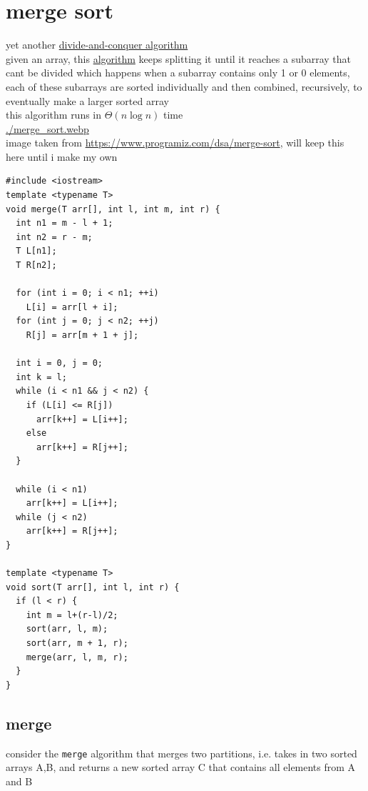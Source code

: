 \documentclass[a4paper,12pt]{article}
\begin{document}
\section{merge sort}
\label{sec:orgbb8d59e}
yet another \href{20220706211939-divide_and_conquer_algorithm.org}{divide-and-conquer algorithm}\\
given an array, this \href{20220706211958-algorithm.org}{algorithm} keeps splitting it until it reaches a subarray that cant be divided which happens when a subarray contains only 1 or 0 elements, each of these subarrays are sorted individually and then combined, recursively, to eventually make a larger sorted array\\
this algorithm runs in \(\Theta(n\log n)\) time\\
\url{./merge\_sort.webp}\\
image taken from \url{https://www.programiz.com/dsa/merge-sort}, will keep this here until i make my own\\
\lstset{language=C++,label=org421d8c4,caption= ,captionpos=b,numbers=none}
\begin{lstlisting}
#include <iostream>
template <typename T>
void merge(T arr[], int l, int m, int r) {
  int n1 = m - l + 1;
  int n2 = r - m;
  T L[n1];
  T R[n2];

  for (int i = 0; i < n1; ++i)
    L[i] = arr[l + i];
  for (int j = 0; j < n2; ++j)
    R[j] = arr[m + 1 + j];

  int i = 0, j = 0;
  int k = l;
  while (i < n1 && j < n2) {
    if (L[i] <= R[j])
      arr[k++] = L[i++];
    else
      arr[k++] = R[j++];
  }

  while (i < n1)
    arr[k++] = L[i++];
  while (j < n2)
    arr[k++] = R[j++];
}

template <typename T>
void sort(T arr[], int l, int r) {
  if (l < r) {
    int m = l+(r-l)/2;
    sort(arr, l, m);
    sort(arr, m + 1, r);
    merge(arr, l, m, r);
  }
}
\end{lstlisting}

\subsection{merge}
\label{sec:orgea3acc2}
consider the \texttt{merge} algorithm that merges two partitions, i.e. takes in two sorted arrays A,B, and returns a new sorted array C that contains all elements from A and B\\
\\
\end{document}
